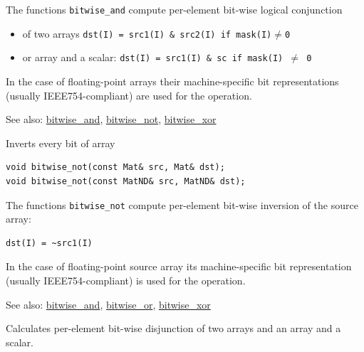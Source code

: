 The functions \texttt{bitwise\_and} compute per-element bit-wise logical conjunction

\begin{itemize}
    \item of two arrays
    \texttt{dst(I) = src1(I) \& src2(I) if mask(I)$\ne$0}
    \item or array and a scalar:
    \texttt{dst(I) = src1(I) \& sc if mask(I) $\ne$ 0}
\end{itemize}

In the case of floating-point arrays their machine-specific bit representations (usually IEEE754-compliant) are used for the operation.

See also: \href{bitwise.and}{bitwise\_and}, \href{bitwise.not}{bitwise\_not}, \href{bitwise.xor}{bitwise\_xor}

Inverts every bit of array

\begin{lstlisting}
void bitwise_not(const Mat& src, Mat& dst);
void bitwise_not(const MatND& src, MatND& dst);
\end{lstlisting}
\begin{description}
\end{description}

The functions \texttt{bitwise\_not} compute per-element bit-wise inversion of the source array:

\begin{lstlisting}
dst(I) = ~src1(I)
\end{lstlisting}

In the case of floating-point source array its machine-specific bit representation (usually IEEE754-compliant) is used for the operation.

See also: \href{bitwise.and}{bitwise\_and}, \href{bitwise.or}{bitwise\_or}, \href{bitwise.xor}{bitwise\_xor}


Calculates per-element bit-wise disjunction of two arrays and an array and a scalar.

